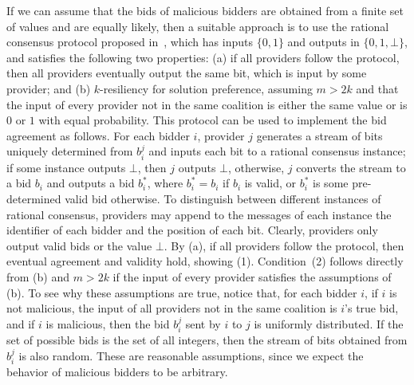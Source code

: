 If we can assume that the bids of malicious bidders are obtained from a finite
set of values and are equally likely, then 
a suitable approach is to use the rational consensus protocol proposed in~\cite{Afek:14},
which has inputs $\{0,1\}$ and outputs in $\{0,1,\bot\}$,
and satisfies the following two properties:
(a) if all providers follow the protocol, then all providers eventually
output the same bit, which is input by some provider;
and (b) $k$-resiliency for solution preference, assuming $m > 2k$
and that the input of every provider not in the same coalition
is either the same value or is $0$ or $1$ with equal probability.
This protocol can be used to implement the bid agreement as follows.
For each bidder $i$, provider $j$ generates a stream of bits uniquely
determined from $b_i^j$ and inputs each bit to a rational consensus instance;
if some instance outputs $\bot$, then $j$ outputs $\bot$,
otherwise, $j$ converts the stream to a bid $b_i$ and outputs a bid $b_i^*$,
where $b_i^* = b_i$ if $b_i$ is valid, or $b_i^*$ is some pre-determined valid bid otherwise.
To distinguish between different instances of rational consensus,
providers may append to the messages of each instance
the identifier of each bidder and the position of each bit.
Clearly, providers only output valid bids or the value $\bot$.
By (a), if all providers follow the protocol, then
eventual agreement and validity hold, showing (1).
Condition~(2) follows directly from (b) and $m>2k$ if
the input of every provider satisfies the assumptions of (b).
To see why these assumptions are true, notice
that, for each bidder $i$, if $i$ is not malicious, 
the input of all providers not in the same coalition is $i$'s true bid,
and if $i$ is malicious, then the bid $b_i^j$ sent by $i$ to $j$ is uniformly
distributed. If the set of possible bids is the set of all integers, 
then the stream of bits obtained from $b_i^j$ is also random.
These are reasonable assumptions, 
since we expect the behavior of malicious bidders to be arbitrary.

